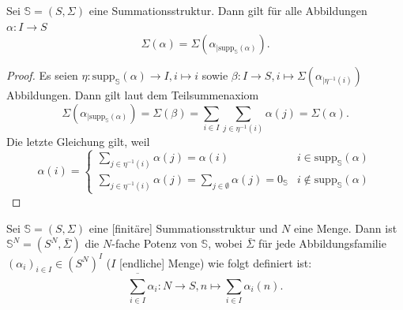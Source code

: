\documentclass{article}
\begin{document}
\begin{theorem}
  Sei $\mathbb{S} = (S, \Sigma)$ eine Summationsstruktur.
  Dann gilt für alle Abbildungen $\alpha \colon I \to S$
  \begin{equation*}
    \Sigma(\alpha) = \Sigma(\alpha_{\mid \text{supp}_\mathbb{S}(\alpha)}).
  \end{equation*}
\end{theorem}
\begin{proof}
  Es seien $\eta \colon \text{supp}_\mathbb{S}(\alpha) \to I, i \mapsto i$
  sowie $\beta \colon I \to S, i \mapsto \Sigma(\alpha_{\mid \eta^{-1}(i)})$ Abbildungen.
  Dann gilt laut dem Teilsummenaxiom
  \begin{equation*}
    \Sigma(\alpha_{\mid \text{supp}_\mathbb{S}(\alpha)})
    = \Sigma(\beta)
    = \sum_{i \in I} \sum_{j \in \eta^{-1}(i)} \alpha(j)
    = \Sigma(\alpha).
  \end{equation*}
  Die letzte Gleichung gilt, weil
  \begin{equation*}
    \alpha(i) = 
    \begin{cases}
      \sum_{j \in \eta^{-1}(i)} \alpha(j) = \alpha(i) & i \in \text{supp}_\mathbb{S}(\alpha) \\
      \sum_{j \in \eta^{-1}(i)} \alpha(j) = \sum_{j \in \emptyset} \alpha(j) = 0_\mathbb{S} & i \notin \text{supp}_\mathbb{S}(\alpha)
    \end{cases}
  \end{equation*}
\end{proof}

\begin{definition}
  Sei $\mathbb{S} = (S, \Sigma)$ eine [finitäre] Summationsstruktur und $N$ eine Menge.
  Dann ist $\mathbb{S}^N = (S^N, \bar\Sigma)$ die $N$-fache Potenz von $\mathbb{S}$,
  wobei $\bar\Sigma$ für jede Abbildungsfamilie $(\alpha_i)_{i \in I} \in (S^N)^I$
  ($I$ [endliche] Menge) wie folgt definiert ist:
  \begin{equation*}
    \overline{\sum_{i \in I}} \alpha_i \colon N \to S, n \mapsto \sum_{i \in I}\alpha_i(n).
  \end{equation*}
\end{definition}
\end{document}
